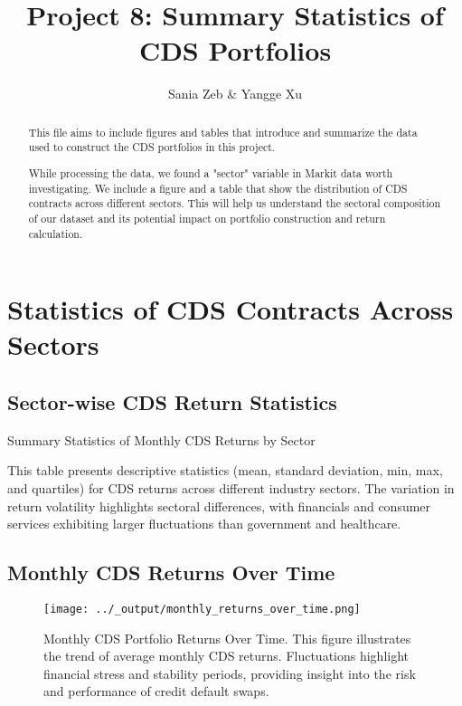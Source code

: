 \documentclass{article}
\title{Project 8: Summary Statistics of CDS Portfolios}
\author{Sania Zeb \& Yangge Xu}
\begin{document}
\maketitle

\begin{abstract}
This file aims to include figures and tables that introduce and summarize the 
data used to construct the CDS portfolios in this project.

While processing the data, we found a "sector" variable in Markit data worth investigating.
We include a figure and a table that show the distribution of CDS contracts across different sectors. 
This will help us understand the sectoral composition of our dataset and its potential impact on portfolio construction and return calculation.
\end{abstract}

\section{Statistics of CDS Contracts Across Sectors}

\subsection{Sector-wise CDS Return Statistics}

\begin{table}
    \centering
    \caption{Summary Statistics of Monthly CDS Returns by Sector}
    \label{table:latex_cds_by_sector_stats}
    
    

    \caption*{
        This table presents descriptive statistics (mean, standard deviation, min, max, and quartiles) 
        for CDS returns across different industry sectors. The variation in return volatility highlights sectoral differences, 
        with financials and consumer services exhibiting larger fluctuations than government and healthcare.
    }
\end{table}



\subsection{Monthly CDS Returns Over Time}
\begin{figure}[h]
    \centering
    \texttt{[image: ../\_output/monthly\_returns\_over\_time.png]}  %
    \caption{\label{fig:monthly_cds_returns} Monthly CDS Portfolio Returns Over Time. 
This figure illustrates the trend of average monthly CDS returns. 
Fluctuations highlight financial stress and stability periods, providing insight into the risk and performance of credit default swaps.}
\end{figure}
\end{document}
